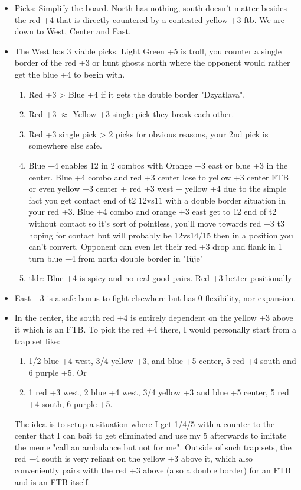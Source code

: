\begin{itemize}
    \item Picks: Simplify the board. North has nothing, south doesn't matter besides the red +4 that is directly countered by a contested yellow +3 ftb. We are down to West, Center and East.
    \item The West has 3 viable picks. Light Green +5 is troll, you counter a single border of the red +3 or hunt ghosts north where the opponent would rather get the blue +4 to begin with. 
    \begin{enumerate}
        \item Red +3 > Blue +4 if it gets the double border "Dzyatlava".
        \item Red +3 $\approx$ Yellow +3 single pick they break each other.
        \item Red +3 single pick > 2 picks for obvious reasons, your 2nd pick is somewhere else safe.
        \item Blue +4 enables 12 in 2 combos with Orange +3 east or blue +3 in the center. Blue +4 combo and red +3 center lose to yellow +3 center FTB or even yellow +3 center + red +3 west + yellow +4 due to the simple fact you get contact end of t2 12vs11 with a double border situation in your red +3. Blue +4 combo and orange +3 east get to 12 end of t2 without contact so it's sort of pointless, you'll move towards red +3 t3 hoping for contact but will probably be 12vs14/15 then in a position you can't convert. Opponent can even let their red +3 drop and flank in 1 turn blue +4 from north double border in "Iŭje"
        \item tldr: Blue +4 is spicy and no real good pairs. Red +3 better positionally
    \end{enumerate}
    \item East +3 is a safe bonus to fight elsewhere but has 0 flexibility, nor expansion. 
    \item In the center, the south red +4 is entirely dependent on the yellow +3 above it which is an FTB. To pick the red +4 there, I would personally start from a trap set like:
    \begin{enumerate}
        \item 1/2 blue +4 west, 3/4 yellow +3, and blue +5 center, 5 red +4 south and 6 purple +5. Or
        \item 1 red +3 west, 2 blue +4 west, 3/4 yellow +3 and blue +5 center, 5 red +4 south, 6 purple +5.
    \end{enumerate}
The idea is to setup a situation where I get 1/4/5 with a counter to the center that I can bait to get eliminated and use my 5 afterwards to imitate the meme "call an ambulance but not for me". Outside of such trap sets, the red +4 south is very reliant on the yellow +3 above it, which also conveniently pairs with the red +3 above (also a double border) for an FTB and is an FTB itself.

\end{itemize}
